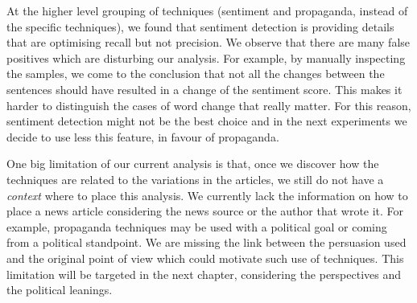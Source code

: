 At the higher level grouping of techniques (sentiment and propaganda, instead of the specific techniques), we found that sentiment detection is providing details that are optimising recall but not precision. We observe that there are many false positives which are disturbing our analysis.
For example, by manually inspecting the samples, we come to the conclusion that not all the changes between the sentences should have resulted in a change of the sentiment score.
This makes it harder to distinguish the cases of word change that really matter. For this reason, sentiment detection might not be the best choice and in the next experiments we decide to use less this feature, in favour of propaganda.


One big limitation of our current analysis is that, once we discover how the techniques are related to the variations in the articles, we still do not have a \emph{context} where to place this analysis. We currently lack the information on how to place a news article considering the news source or the author that wrote it.
For example, propaganda techniques may be used with a political goal or coming from a political standpoint.
We are missing the link between the persuasion used and the original point of view which could motivate such use of techniques.
This limitation will be targeted in the next chapter, considering the perspectives and the political leanings.







